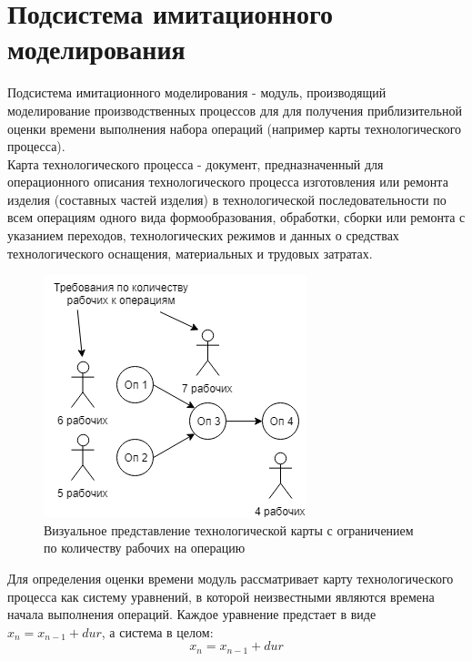 \section{Подсистема имитационного моделирования}
\indent Подсистема имитационного моделирования - модуль, производящий моделирование производственных процессов для для получения приблизительной оценки времени выполнения набора операций (например карты технологического процесса).\\
\indent Карта технологического процесса - документ, предназначенный для операционного описания технологического процесса изготовления или ремонта изделия (составных частей изделия) в технологической последовательности по всем операциям одного вида формообразования, обработки, сборки или ремонта с указанием переходов, технологических режимов и данных о средствах технологического оснащения, материальных и трудовых затратах.\\

\begin{figure}[h]
	\includegraphics[width=\linewidth]{pics/techMapViz.png}
	\caption{Визуальное представление технологической карты с ограничением по количеству рабочих на операцию}
	\label{fig:map}
	\centering
\end{figure}

\indent Для определения оценки времени модуль рассматривает карту технологического процесса как систему уравнений, в которой неизвестными являются времена начала выполнения операций.
Каждое уравнение предстает в виде $x_n = x_{n-1} + dur$, а система в целом:
\begin{equation}
	x_n = x_{n-1} + dur
\end{equation}

